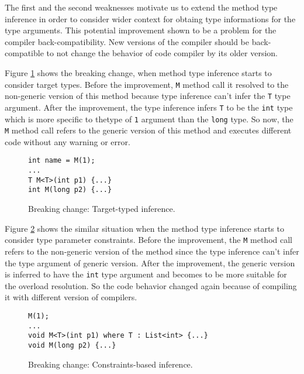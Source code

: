 \par
{}
The first and the second weaknesses motivate us to extend the method type inference in order to consider wider context for obtaing type informations for the type arguments.
This potential improvement shown to be a problem for the compiler back-compatibility.
New versions of the compiler should be back-compatible to not change the behavior of code compiler by its older version.
\par
{}
Figure \ref{img30:breakingChange1} shows the breaking change, when method type inference starts to consider target types.
Before the improvement, \texttt{M} method call it resolved to the non-generic version of this method because type inference can't infer the \texttt{T} type argument.
After the improvement, the type inference infers \texttt{T} to be the \texttt{int} type which is more specific to thetype of \texttt{1} argument than the \texttt{long} type.
So now, the \texttt{M} method call refers to the generic version of this method and executes different code without any warning or error.
\begin{figure}[h]
\begin{lstlisting}[style=csharp]
int name = M(1);
...
T M<T>(int p1) {...}
int M(long p2) {...}
\end{lstlisting}
\caption{Breaking change: Target-typed inference.}
\label{img30:breakingChange1}
\end{figure}
\par
{}
Figure \ref{img31:breakingChange2} shows the similar situation when the method type inference starts to consider type parameter constraints.
Before the improvement, the \texttt{M} method call refers to the non-generic version of the method since the type inference can't infer the type argument of generic version.
After the improvement, the generic version is inferred to have the \texttt{int} type argument and becomes to be more suitable for the overload resolution.
So the code behavior changed again because of compiling it with different version of compilers.
\begin{figure}[h]
\begin{lstlisting}[style=csharp]
M(1);
...
void M<T>(int p1) where T : List<int> {...}
void M(long p2) {...}
\end{lstlisting}
\caption{Breaking change: Constraints-based inference.}
\label{img31:breakingChange2}
\end{figure}
